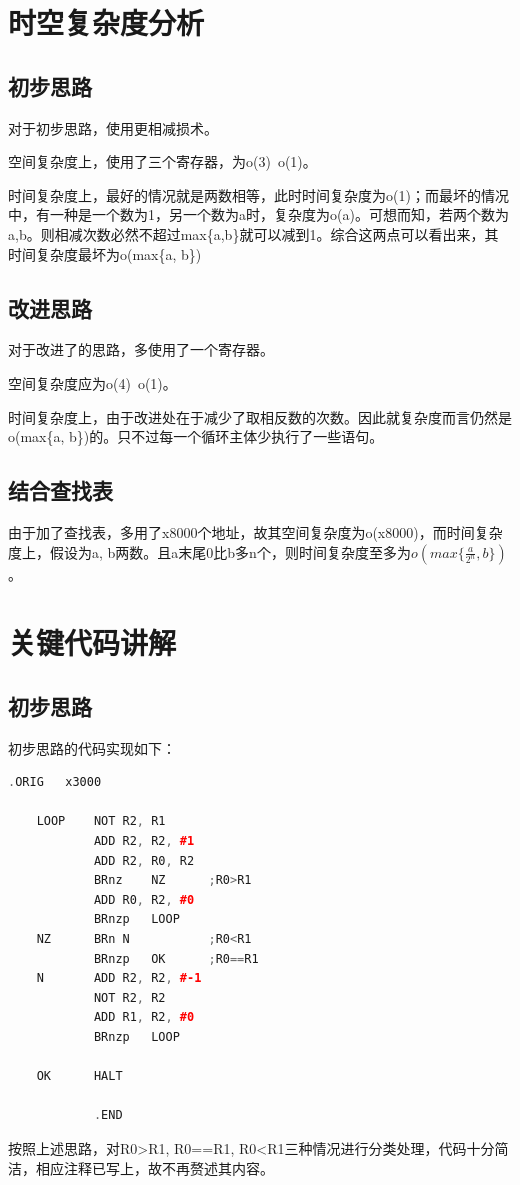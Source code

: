 \documentclass[UTF8]{article}
\begin{document}
	
	\section{时空复杂度分析}
	\subsection{初步思路}
	对于初步思路，使用更相减损术。\par
	空间复杂度上，使用了三个寄存器，为o(3)~o(1)。\par
	时间复杂度上，最好的情况就是两数相等，此时时间复杂度为o(1)；而最坏的情况中，有一种是一个数为1，另一个数为a时，复杂度为o(a)。可想而知，若两个数为a,b。则相减次数必然不超过max\{a,b\}就可以减到1。综合这两点可以看出来，其时间复杂度最坏为o(max\{a, b\})
	\subsection{改进思路}
	对于改进了的思路，多使用了一个寄存器。\par
	空间复杂度应为o(4)~o(1)。\par
	时间复杂度上，由于改进处在于减少了取相反数的次数。因此就复杂度而言仍然是o(max\{a, b\})的。只不过每一个循环主体少执行了一些语句。\par
	\subsection{结合查找表}
	由于加了查找表，多用了x8000个地址，故其空间复杂度为o(x8000)，而时间复杂度上，假设为a, b两数。且a末尾0比b多n个，则时间复杂度至多为$o(max\{\frac{a}{2^{n}}, b\})$。\par
	
	
	\section{关键代码讲解}
	\subsection{初步思路}
	初步思路的代码实现如下：\par
	\begin{lstlisting}[language=C++, name=初步思路的代码]
			.ORIG	x3000
	
	LOOP	NOT	R2, R1
			ADD	R2, R2, #1
			ADD	R2, R0, R2	
			BRnz	NZ		;R0>R1
			ADD	R0, R2, #0
			BRnzp	LOOP
	NZ		BRn	N			;R0<R1
			BRnzp	OK		;R0==R1
	N		ADD	R2, R2, #-1
			NOT	R2, R2
			ADD	R1, R2, #0
			BRnzp	LOOP
		
	OK		HALT
			
			.END
	\end{lstlisting}
	按照上述思路，对R0>R1, R0==R1, R0<R1三种情况进行分类处理，代码十分简洁，相应注释已写上，故不再赘述其内容。\par
	
\end{document}
